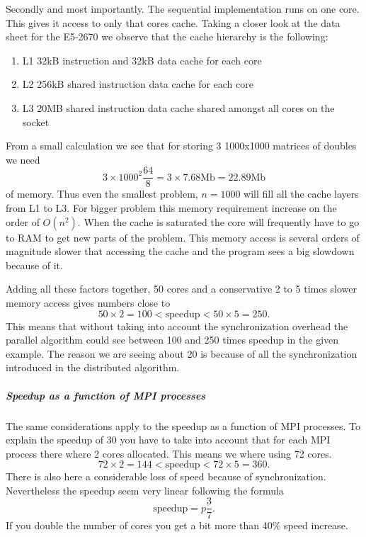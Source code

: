 \documentclass{article}
\begin{document}
Secondly and most importantly. The sequential implementation runs on one core. This
gives it access to only that cores cache. Taking a closer look at the data sheet
for the E5-2670\cite{intel-datasheet} we observe that the cache hierarchy is
the following:
\begin{enumerate}
		\item L1 32kB instruction and 32kB data cache for each core
		\item L2 256kB shared instruction data cache for each core
		\item L3 20MB shared instruction data cache shared amongst all cores on the socket
\end{enumerate}
From a small calculation we see that for storing 3 1000x1000 matrices of doubles we need
\[
3 \times 1000^2 \frac{64}{8} = 3 \times 7.68 \text{Mb} = 22.89 \text{Mb}
\]
of memory.
Thus even the smallest problem, $n=1000$ will fill all the cache layers from L1 to L3.
For bigger problem this memory requirement increase on the order of $O(n^2)$.
When the cache is saturated the core will frequently have to go to RAM to get new parts of the problem. This memory
access is several orders of magnitude slower that accessing the cache and the program sees a big
slowdown because of it.

Adding all these factors together, 50 cores and a conservative 2 to 5 times slower memory access
gives numbers close to
\[
50 \times 2 = 100 < \text{speedup} < 50 \times 5 = 250.
\]
This means that without taking into account the synchronization overhead
the parallel algorithm could see between 100 and 250 times speedup in the given example.
The reason we are seeing about 20 is because
of all the synchronization introduced in the distributed algorithm.

\subparagraph{Speedup as a function of MPI processes}
The same considerations apply to the speedup as a function of MPI processes.
To explain the speedup of 30 you have to take into account that for each MPI
process there where 2 cores allocated. This means we where using 72 cores.
\[
72 \times 2 = 144 < \text{speedup} < 72 \times 5 = 360.
\]
There is also here a considerable loss of speed because of synchronization.
Nevertheless the speedup seem very linear following the formula
\[
\text{speedup} = p\frac{3}{7}.
\]
If you double the number of cores you get a bit more than 40\%
speed increase.
\end{document}
